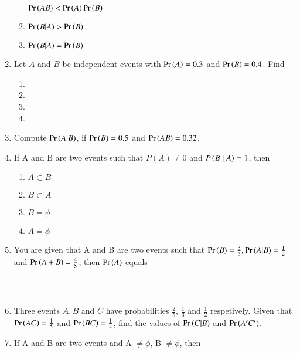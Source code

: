 \begin{enumerate}[label=\thesubsection.\arabic*,ref=\thesubsection.\theenumi]
\begin{multicols}{2}
\begin{enumerate}
  \label{12.13.6.18.B}
 $\Pr\left(AB\right)< \Pr\left(A\right)\Pr\left(B\right)$
 \item 
 \label{12.13.6.18.C}
 $\Pr\left(B|A\right) > \Pr\left(B\right)$
 \item 
  \label{12.13.6.18.D}
 $\Pr\left(B|A\right) = \Pr\left(B\right)$
 \end{enumerate}
\end{multicols}
\solution 

\item Let  $A$ and $B$ be independent events with $\Pr\left(A\right) = 0.3$ and $\Pr\left(B\right) = 0.4$. Find 
\begin{multicols}{4}
\begin{enumerate}
\item {} \item {}

\item {} \item {}
\end{enumerate}
\end{multicols}
\solution

\item Compute $\Pr\left(A|B\right)$, if $\Pr\left(B\right) = 0.5$ and $\Pr\left(AB\right) = 0.32$.\\
	\solution
	
	\item If A and B are two events such that $P(A) \neq 0$ and $P\left(B\mid A\right) = 1$, then
\begin{multicols}{4}
\begin{enumerate}
\item $A \subset B$
\item $B\subset A$
\item $B = \phi$
\item $A = \phi$
\end{enumerate}
\end{multicols}
		\solution
		
\item You are given that A and B are two events such that $\Pr\left(B\right)=\frac{3}{5},\Pr\left(A|B\right)=\frac{1}{2}$ and $\Pr\left(A+B\right)=\frac{4}{5}$, then $\Pr\left(A\right)$ equals \rule{1cm}{0.1pt}.
	\\
\solution

\item Three events $A, B$ and $C$ have probabilities $\frac{2}{5}$, $\frac{1}{3}$ and $\frac{1}{2}$ respetively. Given that $\Pr\left(AC\right)=\frac{1}{5}$ and $\Pr\left(BC\right)=\frac{1}{4}$, find the values of $\Pr\left(C | B\right)$ and $\Pr\left(A^{\prime} C^{\prime}\right)$.
	\\
\solution

%
\item If A and B are two events and A $\ne \phi$, B $\ne \phi$, then

\end{enumerate}
